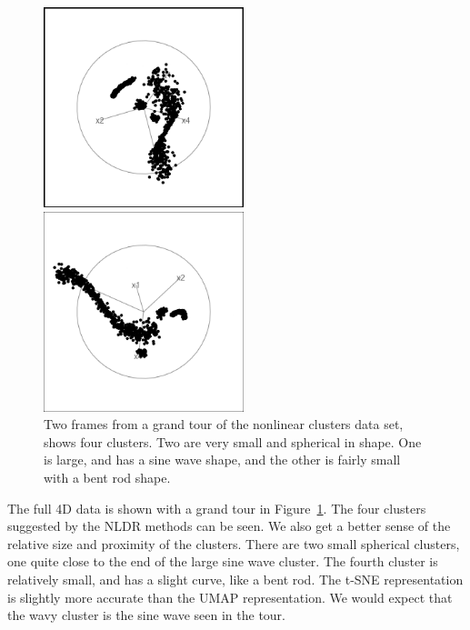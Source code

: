 \documentclass[
  letterpaper,
]{krantz}
\begin{document}
\begin{figure}

\begin{minipage}{0.50\linewidth}
\includegraphics[width=2.29167in,height=\textheight,keepaspectratio]{images/clusters_nonlin_60.png}\end{minipage}%
%
\begin{minipage}{0.50\linewidth}
\includegraphics[width=2.29167in,height=\textheight,keepaspectratio]{images/clusters_nonlin_272.png}\end{minipage}%

\caption{\label{fig-clusters-nonlin-pdf}Two frames from a grand tour of
the nonlinear clusters data set, shows four clusters. Two are very small
and spherical in shape. One is large, and has a sine wave shape, and the
other is fairly small with a bent rod shape. }

\end{figure}%

The full 4D data is shown with a grand tour in
Figure~\ref{fig-clusters-nonlin-pdf}. The four clusters suggested by the
NLDR methods can be seen. We also get a better sense of the relative
size and proximity of the clusters. There are two small spherical
clusters, one quite close to the end of the large sine wave cluster. The
fourth cluster is relatively small, and has a slight curve, like a bent
rod. The t-SNE representation is slightly more accurate than the UMAP
representation. We would expect that the wavy cluster is the sine wave
seen in the tour.
\end{document}
